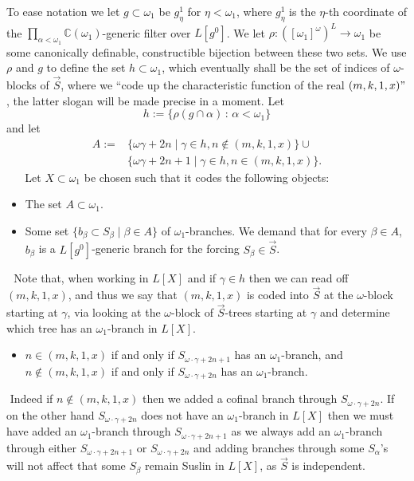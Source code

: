 \documentclass[a4paper,11pt]{article}
\begin{document}
    
     To ease notation we let $g \subset \omega_1$ be $g^1_{\eta}$ for $\eta < \omega_1$, where $g^1_{\eta}$ is the $\eta$-th coordinate of the $\prod_{\alpha < \omega_1} \mathbb{C}(\omega_1)$-generic filter over $L[g^0]$. We let $\rho: ([\omega_1]^{\omega})^{L} \rightarrow \omega_1$ be some canonically definable, constructible bijection between these two sets. We use $\rho$ and $g$ to define the set $h \subset \omega_1$, which eventually shall be the set of indices of $\omega$-blocks of $\vec{S}$, where we ``code up the characteristic function of the real $(m,k,1,x)"$, the latter slogan will be made precise in a moment. Let \[h:= \{\rho( g \cap \alpha) \,: \, \alpha < \omega_1 \}\] and let
    ﻿
    \begin{align*}
    A:= &\{ \omega \gamma +2n \mid \gamma \in h, n \notin (m,k,1,x) \} \cup \\& \{\omega \gamma + 2n+1 \mid \gamma \in h, n \in (m,k,1,x) \}.
    \end{align*}
    ﻿
    ﻿
    ﻿
    ﻿
    ﻿
    Let $X \subset \omega_1$ be chosen such that it codes the following objects:
    ﻿
    \begin{itemize}
    ﻿
    \item The set $A \subset \omega_1$.
    ﻿
    \item Some set $\{ b_{\beta} \subset S_{\beta} \mid \beta \in A \}$ of $\omega_1$-branches. We demand that  for every $\beta\in A$,  $b_{\beta}$ is a $L[g^0]$-generic branch for the forcing $S_{\beta} \in \vec{S}$. 
    ﻿
    ﻿
    \end{itemize}
    ﻿
    ﻿
    Note that, when working in $L[X]$ and if $\gamma \in h$ then we can read off $(m,k,1,x)$, and thus  we say that $(m,k,1,x)$ is coded into $\vec{S}$ at the $\omega$-block starting at $\gamma$,  via looking at the $\omega$-block of $\vec{S}$-trees starting at $\gamma$ and determine which tree has an $\omega_1$-branch in $L[X]$.
    ﻿
    \begin{itemize}
    ﻿
     \item[$(\ast)_{\gamma}$]  $n \in (m,k,1,x)$ if and only if $S_{\omega \cdot \gamma +2n+1}$ has an $\omega_1$-branch, and $n \notin (m,k,1,x)$ if and only if $S_{\omega \cdot \gamma +2n}$ has an $\omega_1$-branch.
    ﻿
    \end{itemize}
    ﻿
    Indeed if $n \notin (m,k,1,x)$ then we added a cofinal branch through $S_{\omega \cdot \gamma+ 2n}$. If on the other hand $S_{\omega \cdot\gamma +2n}$ does not have an $\omega_1$-branch in $L[X]$ then we must have added an $\omega_1$-branch through $S_{\omega \cdot \gamma +2n+1}$ as we always add an $\omega_1$-branch through either $S_{\omega \cdot \gamma +2n+1}$ or $S_{\omega \cdot \gamma +2n}$ and adding branches through some $S_{\alpha}$'s  will not affect that some $S_{\beta}$ remain Suslin in $L[X]$, as $\vec{S}$ is independent.
    
\end{document}
